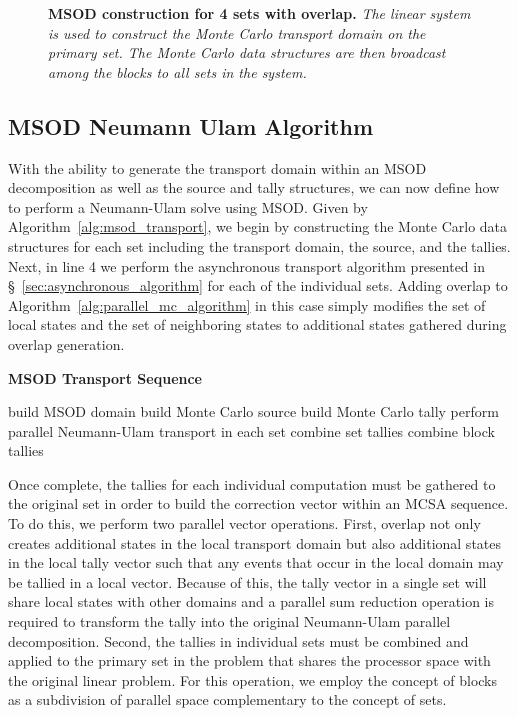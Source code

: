 \begin{figure}[t!]
  \begin{center}
    \scalebox{0.6}{  }
  \end{center}
  \caption{\textbf{MSOD construction for 4 sets with overlap.}
    \textit{The linear system is used to construct the Monte Carlo
      transport domain on the primary set. The Monte Carlo data
      structures are then broadcast among the blocks to all sets in
      the system.}}
  \label{fig:msod_construction}
\end{figure}

\clearpage

\subsection{MSOD Neumann Ulam Algorithm }
\label{subsec:msod_algorithm}

With the ability to generate the transport domain within an MSOD
decomposition as well as the source and tally structures, we can now
define how to perform a Neumann-Ulam solve using MSOD. Given by
Algorithm~\ref{alg:msod_transport}, we begin by constructing the Monte
Carlo data structures for each set including the transport domain, the
source, and the tallies. Next, in line 4 we perform the asynchronous
transport algorithm presented in \S~\ref{sec:asynchronous_algorithm}
for each of the individual sets. Adding overlap to
Algorithm~\ref{alg:parallel_mc_algorithm} in this case simply modifies
the set of local states and the set of neighboring states to
additional states gathered during overlap generation.

\begin{algorithm}[h!]
  \caption{\textbf{MSOD Transport Sequence}}
  \label{alg:msod_transport}
  \begin{algorithmic}[1]
    \State build MSOD domain
    \State build Monte Carlo source
    \State build Monte Carlo tally
    \State perform parallel Neumann-Ulam transport in each set
    \State combine set tallies
    \State combine block tallies
  \end{algorithmic}
\end{algorithm}

Once complete, the tallies for each individual computation must be
gathered to the original set in order to build the correction vector
within an MCSA sequence. To do this, we perform two parallel vector
operations. First, overlap not only creates additional states in the
local transport domain but also additional states in the local tally
vector such that any events that occur in the local domain may be
tallied in a local vector. Because of this, the tally vector in a
single set will share local states with other domains and a parallel
sum reduction operation is required to transform the tally into the
original Neumann-Ulam parallel decomposition. Second, the tallies in
individual sets must be combined and applied to the primary set in the
problem that shares the processor space with the original linear
problem. For this operation, we employ the concept of blocks as a
subdivision of parallel space complementary to the concept of sets.

